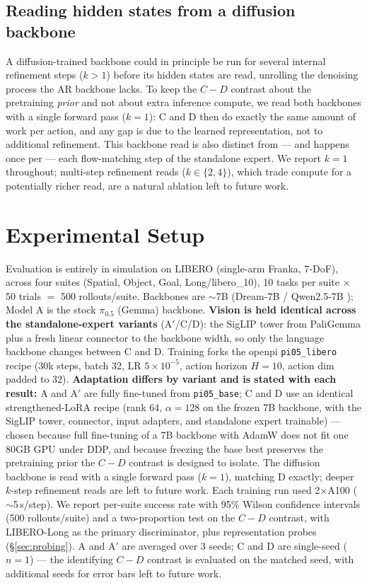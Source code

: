 \documentclass[conference]{IEEEtran}
\begin{document}
\subsection{Reading hidden states from a diffusion backbone}
\label{sec:kread}
A diffusion-trained backbone could in principle be run for several internal
refinement steps ($k>1$) before its hidden states are read, unrolling the
denoising process the AR backbone lacks. To keep the $C-D$ contrast about the
pretraining \emph{prior} and not about extra inference compute, we read both
backbones with a single forward pass ($k{=}1$): C and D then do exactly the same
amount of work per action, and any gap is due to the learned representation, not
to additional refinement. This backbone read is also distinct from --- and
happens once per --- each flow-matching step of the standalone expert. We report
$k{=}1$ throughout; multi-step refinement reads ($k\in\{2,4\}$), which trade
compute for a potentially richer read, are a natural ablation left to future work.

\section{Experimental Setup}
Evaluation is entirely in simulation on LIBERO \cite{libero} (single-arm Franka,
7-DoF), across four suites (Spatial, Object, Goal, Long/libero\_10), 10 tasks per
suite $\times$ 50 trials $=$ 500 rollouts/suite. Backbones are $\sim$7B (Dream-7B
\cite{dream} / Qwen2.5-7B \cite{qwen25}); Model A is the stock $\pi_{0.5}$ (Gemma)
backbone. \textbf{Vision is held identical across the standalone-expert variants}
(A$'$/C/D): the SigLIP tower from PaliGemma plus a fresh linear connector to the
backbone width, so only the language backbone changes between C and D. Training
forks the openpi \texttt{pi05\_libero} recipe (30k steps, batch 32, LR $5\times
10^{-5}$, action horizon $H{=}10$, action dim padded to 32). \textbf{Adaptation
differs by variant and is stated with each result:} A and A$'$ are fully
fine-tuned from \texttt{pi05\_base}; C and D use an identical strengthened-LoRA
recipe (rank 64, $\alpha{=}128$ on the frozen 7B backbone, with the SigLIP tower,
connector, input adapters, and standalone expert trainable) --- chosen because
full fine-tuning of a 7B backbone with AdamW does not fit one 80GB GPU under DDP,
and because freezing the base best preserves the pretraining prior the $C-D$
contrast is designed to isolate. The diffusion backbone is read with a single
forward pass ($k{=}1$), matching D exactly; deeper $k$-step refinement reads are
left to future work. Each training run used 2$\times$A100 ($\sim$5\,s/step). We
report per-suite success rate with 95\% Wilson confidence intervals (500
rollouts/suite) and a two-proportion test on the $C-D$ contrast, with LIBERO-Long
as the primary discriminator, plus representation probes (\S\ref{sec:probing}). A
and A$'$ are averaged over 3 seeds; C and D are single-seed ($n{=}1$) --- the
identifying $C-D$ contrast is evaluated on the matched seed, with additional seeds
for error bars left to future work.
\end{document}
